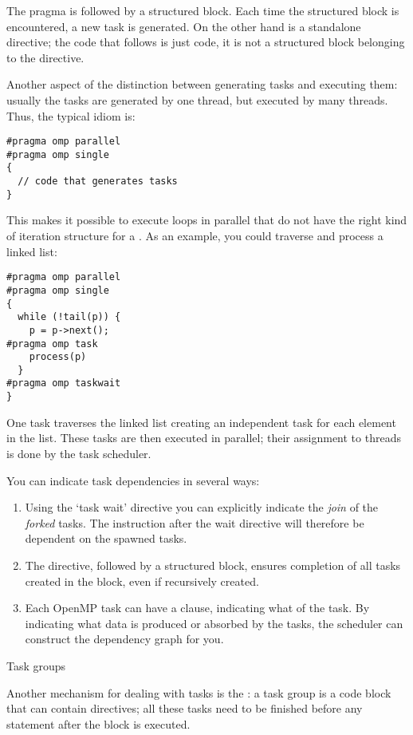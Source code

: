 The  pragma is followed by a structured block.
Each time the structured block is encountered, a new task is generated.
On the other hand  is a standalone directive; 
the code that follows is just code, it is not a structured block belonging
to the directive.

Another aspect of the distinction between generating tasks and executing them:
usually the tasks are generated by one thread, but executed by many threads.
Thus, the typical idiom is:
\begin{verbatim}
#pragma omp parallel
#pragma omp single
{
  // code that generates tasks
}  
\end{verbatim}

This makes it possible to execute loops in parallel
that do not have the right kind of iteration structure
for a . As an example, you
could traverse and process a linked list:
\begin{verbatim}
#pragma omp parallel
#pragma omp single
{
  while (!tail(p)) {
    p = p->next();
#pragma omp task
    process(p)
  }
#pragma omp taskwait
}
\end{verbatim}
One task traverses the linked list creating an independent
task for each element in the list. These tasks are then
executed in parallel; their assignment to threads
is done by the task scheduler.

You can indicate task dependencies in several ways:
\begin{enumerate}
\item Using the `task wait' directive you can explicitly indicate
  the \emph{join} of the
  \emph{forked} tasks. The instruction after the wait directive
  will therefore be dependent on the spawned tasks.
\item The  directive, followed
  by a structured block, ensures completion of all tasks
  created in the block, even if recursively created.
\item Each OpenMP task can have a 
  clause, indicating what  of the task.
  By indicating what data is produced or absorbed by the tasks,
  the scheduler can construct the dependency graph for you.
\end{enumerate}

 {Task groups}

Another mechanism for dealing with tasks is the
: a task group is a code block that can
contain  directives; all these tasks need to be
finished before any statement after the block is executed.

